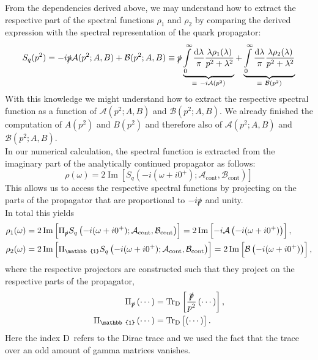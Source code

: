 \documentclass[digital, %
			   openright, %
			   parskip=half,
			   11pt]{mythesis}
\begin{document}
 \normalcolor
From the dependencies derived above, we may understand how to extract the respective part of the spectral functions $\rho_1$ and $\rho_2$ by comparing the derived expression with the spectral representation of the quark propagator:
\begin{equation}
	S_q(p^2) = -i\slashed{p} \mathcal{A}(p^2; A,B) + \mathcal{B}(p^2; A,B) \equiv \slashed{p}\underbrace{\int\limits_0^\infty\frac{\dd\lambda}{\pi}\frac{\lambda\rho_1(\lambda)}{p^2+\lambda^2}}_{\equiv\ -i\mathcal{A}(p^2)} + \underbrace{\int\limits_0^\infty\frac{\dd\lambda}{\pi}\frac{\lambda\rho_2(\lambda)}{p^2+\lambda^2}}_{\equiv\ \mathcal{B}(p^2)}
\end{equation}
With this knowledge we might understand how to extract the respective spectral function as a function of $\mathcal{A}(p^2;A,B)$ and $\mathcal{B}(p^2;A,B)$. We already finished the computation of $A(p^2)$ and $B(p^2)$ and therefore also of $\mathcal{A}(p^2;A,B)$ and $\mathcal{B}(p^2;A,B)$.\\
In our numerical calculation, the spectral function is extracted from the imaginary part of the analytically continued propagator as follows:
\begin{equation}
	\rho(\omega) = 2 \operatorname{Im}\left[S_{q}\left(-i(\omega + i0^+); \mathcal{A}_{\mathrm{cont}}, \mathcal{B}_{\mathrm{cont}}\right)\right]
\end{equation}
This allows us to access the respective spectral functions by projecting on the parts of the propagator that are proportional to $-i\slashed{p}$ and unity.\\
In total this yields
\begin{align}
	\rho_1(\omega) &= 2 \operatorname{Im}\left[\Pi_{\slashed{p}} S_{q}\left(-i(\omega + i0^+); \mathcal{A}_{\mathrm{cont}}, \mathcal{B}_{\mathrm{cont}}\right)\right] = 2 \operatorname{Im}\left[-i\mathcal{A}\left(-i(\omega + i0^+)\right)\right], \\
	\rho_2(\omega) &= 2 \operatorname{Im}\left[\Pi_{\mathbb{1}} S_{q}\left(-i(\omega + i0^+); \mathcal{A}_{\mathrm{cont}}, \mathcal{B}_{\mathrm{cont}}\right)\right]  = 2 \operatorname{Im}\left[\mathcal{B}\left(-i(\omega + i0^+)\right)\right],
\end{align}
where the respective projectors are constructed such that they project on the respective parts of the propagator,
\begin{align}
	\Pi_{\slashed{p}}\left(\cdots\right) &= \operatorname{Tr}_{\mathrm{D}}\left[\frac{\slashed{p}}{p^2} \left(\cdots\right)\right],\\
	\Pi_{\mathbb{1}}\left(\cdots\right) &= \operatorname{Tr}_{\mathrm{D}}\left[\left(\cdots\right)\right].
\end{align}
Here the index $\mathrm{D}$\ refers to the Dirac trace and we used the fact that the trace over an odd amount of gamma matrices vanishes.
\newpage
\end{document}
